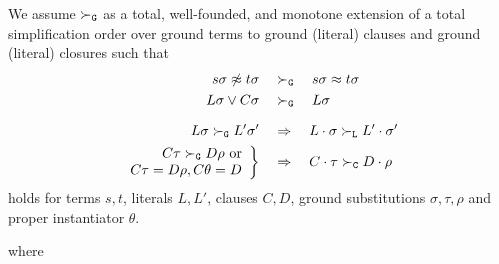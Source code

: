 \begin{definition}

    We assume $\mathrel\succ_{\mathtt{G}}$ as a
        total, well-founded, and monotone extension of a
        total simplification order over ground terms to ground (literal) clauses
        and ground (literal) closures such that
        \begin{align*}
            s\sigma\not\approx t\sigma \quad&\mathrel\succ_{\mathtt{G}}\quad s\sigma\approx t\sigma
            \\
            L\sigma\lor C\sigma \quad&\mathrel\succ_{\mathtt{G}}\quad L\sigma
            \\[0.7em]
            L\sigma \mathrel\succ_{\mathtt{G}} L'\sigma'
            \quad&\Rightarrow\quad
            L\cdot\sigma \mathrel\succ_{\mathtt{L}} L'\cdot\sigma'
        \\
        \left.
        \begin{array}{r}
            C\tau\mathrel\succ_{\mathtt{G}} D\rho\text{ or}
            \\
            C\tau=D\rho, C\theta=D
        \end{array}
        \right\}
            \quad&\Rightarrow\quad
            C\cdot\tau\mathrel\succ_{\mathtt{C}} D\cdot\rho
        \end{align*}
        holds for terms $s,t$,
        literals $L, L'$,
        clauses $C,D$,
        ground substitutions $\sigma, \tau, \rho$
        and proper instantiator $\theta$.

\end{definition}

\begin{definition}
    
    where
    
    \end{definition}

